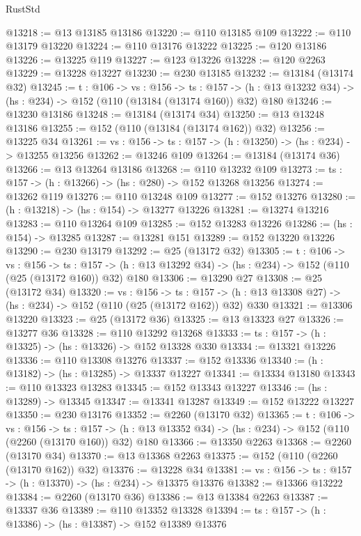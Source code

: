 \begin{lexlean}{RustStd}
\begin{coremodule}
@13218 := @13 @13185 @13186
@13220 := @110 @13185 @109
@13222 := @110 @13179 @13220
@13224 := @110 @13176 @13222
@13225 := @120 @13186
@13226 := @13225 @119
@13227 := @123 @13226
@13228 := @120 @2263
@13229 := @13228 @13227
@13230 := @230 @13185
@13232 := @13184 (@13174 @32)
@13245 := {t : @106} ->
  {vs : @156} ->
  {ts : @157} -> (h : @13 @13232 @34) -> (hs : @234) -> @152 (@110 (@13184 (@13174 @160)) @32) @180
@13246 := @13230 @13186
@13248 := @13184 (@13174 @34)
@13250 := @13 @13248 @13186
@13255 := @152 (@110 (@13184 (@13174 @162)) @32)
@13256 := @13225 @34
@13261 := {vs : @156} -> {ts : @157} -> (h : @13250) -> (hs : @234) -> @13255 @13256
@13262 := @13246 @109
@13264 := @13184 (@13174 @36)
@13266 := @13 @13264 @13186
@13268 := @110 @13232 @109
@13273 := {ts : @157} -> (h : @13266) -> (hs : @280) -> @152 @13268 @13256
@13274 := @13262 @119
@13276 := @110 @13248 @109
@13277 := @152 @13276
@13280 := (h : @13218) -> (hs : @154) -> @13277 @13226
@13281 := @13274 @13216
@13283 := @110 @13264 @109
@13285 := @152 @13283 @13226
@13286 := (hs : @154) -> @13285
@13287 := @13281 @151
@13289 := @152 @13220 @13226
@13290 := @230 @13179
@13292 := @25 (@13172 @32)
@13305 := {t : @106} ->
  {vs : @156} ->
  {ts : @157} -> (h : @13 @13292 @34) -> (hs : @234) -> @152 (@110 (@25 (@13172 @160)) @32) @180
@13306 := @13290 @27
@13308 := @25 (@13172 @34)
@13320 := {vs : @156} ->
  {ts : @157} -> (h : @13 @13308 @27) -> (hs : @234) -> @152 (@110 (@25 (@13172 @162)) @32) @330
@13321 := @13306 @13220
@13323 := @25 (@13172 @36)
@13325 := @13 @13323 @27
@13326 := @13277 @36
@13328 := @110 @13292 @13268
@13333 := {ts : @157} -> (h : @13325) -> (hs : @13326) -> @152 @13328 @330
@13334 := @13321 @13226
@13336 := @110 @13308 @13276
@13337 := @152 @13336
@13340 := (h : @13182) -> (hs : @13285) -> @13337 @13227
@13341 := @13334 @13180
@13343 := @110 @13323 @13283
@13345 := @152 @13343 @13227
@13346 := (hs : @13289) -> @13345
@13347 := @13341 @13287
@13349 := @152 @13222 @13227
@13350 := @230 @13176
@13352 := @2260 (@13170 @32)
@13365 := {t : @106} ->
  {vs : @156} ->
  {ts : @157} -> (h : @13 @13352 @34) -> (hs : @234) -> @152 (@110 (@2260 (@13170 @160)) @32) @180
@13366 := @13350 @2263
@13368 := @2260 (@13170 @34)
@13370 := @13 @13368 @2263
@13375 := @152 (@110 (@2260 (@13170 @162)) @32)
@13376 := @13228 @34
@13381 := {vs : @156} -> {ts : @157} -> (h : @13370) -> (hs : @234) -> @13375 @13376
@13382 := @13366 @13222
@13384 := @2260 (@13170 @36)
@13386 := @13 @13384 @2263
@13387 := @13337 @36
@13389 := @110 @13352 @13328
@13394 := {ts : @157} -> (h : @13386) -> (hs : @13387) -> @152 @13389 @13376

\end{coremodule}
\end{lexlean}
